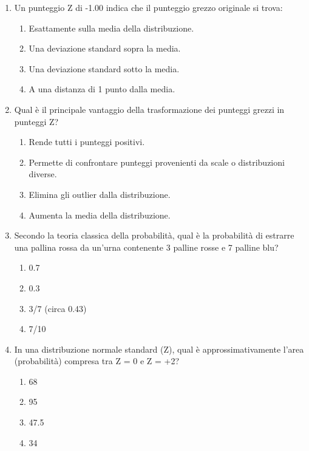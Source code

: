 \documentclass[12pt, a4paper]{article}
\begin{document}
\begin{enumerate}
    \item Un punteggio Z di -1.00 indica che il punteggio grezzo originale si trova:
    \begin{enumerate}
        \item Esattamente sulla media della distribuzione.
        \item Una deviazione standard sopra la media.
        \item Una deviazione standard sotto la media.
        \item A una distanza di 1 punto dalla media.
    \end{enumerate}

    \item Qual è il principale vantaggio della trasformazione dei punteggi grezzi in punteggi Z?
    \begin{enumerate}
        \item Rende tutti i punteggi positivi.
        \item Permette di confrontare punteggi provenienti da scale o distribuzioni diverse.
        \item Elimina gli outlier dalla distribuzione.
        \item Aumenta la media della distribuzione.
    \end{enumerate}

    \item Secondo la teoria classica della probabilità, qual è la probabilità di estrarre una pallina rossa da un'urna contenente 3 palline rosse e 7 palline blu?
    \begin{enumerate}
        \item 0.7
        \item 0.3
        \item 3/7 (circa 0.43)
        \item 7/10
    \end{enumerate}

    \item In una distribuzione normale standard (Z), qual è approssimativamente l'area (probabilità) compresa tra Z = 0 e Z = +2?
    \begin{enumerate}
        \item 68%
        \item 95%
        \item 47.5%
        \item 34%
    \end{enumerate}


\end{enumerate}
\end{document}
